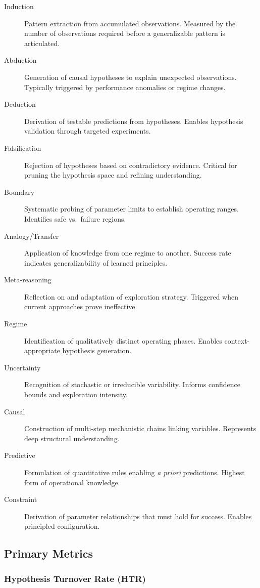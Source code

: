 \documentclass[10pt,twocolumn]{article}
\begin{document}
\begin{description}
    \item[Induction] Pattern extraction from accumulated observations. Measured by the number of observations required before a generalizable pattern is articulated.
    \item[Abduction] Generation of causal hypotheses to explain unexpected observations. Typically triggered by performance anomalies or regime changes.
    \item[Deduction] Derivation of testable predictions from hypotheses. Enables hypothesis validation through targeted experiments.
    \item[Falsification] Rejection of hypotheses based on contradictory evidence. Critical for pruning the hypothesis space and refining understanding.
    \item[Boundary] Systematic probing of parameter limits to establish operating ranges. Identifies safe vs.\ failure regions.
    \item[Analogy/Transfer] Application of knowledge from one regime to another. Success rate indicates generalizability of learned principles.
    \item[Meta-reasoning] Reflection on and adaptation of exploration strategy. Triggered when current approaches prove ineffective.
    \item[Regime] Identification of qualitatively distinct operating phases. Enables context-appropriate hypothesis generation.
    \item[Uncertainty] Recognition of stochastic or irreducible variability. Informs confidence bounds and exploration intensity.
    \item[Causal] Construction of multi-step mechanistic chains linking variables. Represents deep structural understanding.
    \item[Predictive] Formulation of quantitative rules enabling \emph{a priori} predictions. Highest form of operational knowledge.
    \item[Constraint] Derivation of parameter relationships that must hold for success. Enables principled configuration.
\end{description}

\subsection{Primary Metrics}

\subsubsection{Hypothesis Turnover Rate (HTR)}
\end{document}
